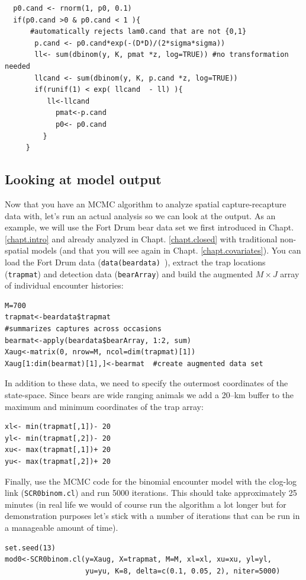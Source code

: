 \begin{verbatim}
  p0.cand <- rnorm(1, p0, 0.1)
  if(p0.cand >0 & p0.cand < 1 ){   
      #automatically rejects lam0.cand that are not {0,1}
       p.cand <- p0.cand*exp(-(D*D)/(2*sigma*sigma))
       ll<- sum(dbinom(y, K, pmat *z, log=TRUE)) #no transformation needed
       llcand <- sum(dbinom(y, K, p.cand *z, log=TRUE))
       if(runif(1) < exp( llcand  - ll) ){
          ll<-llcand
            pmat<-p.cand
            p0<- p0.cand
         }
     }
\end{verbatim}


\subsection{Looking at model output}
Now that you have an MCMC algorithm to analyze spatial capture-recapture 
data with, let's run an actual analysis so we can look at the output. As 
an example, we will use the Fort Drum 
bear data set we first introduced in Chapt. \ref{chapt.intro} and already analyzed in Chapt. \ref{chapt.closed} with 
traditional non-spatial models (and that you will see again in Chapt. 
\ref{chapt.covariates}). You can load the Fort Drum data
(\mbox{\tt data(beardata) }), extract the 
trap locations (\mbox{\tt trapmat}) and 
detection data (\mbox{\tt bearArray}) and build the augmented $M \times J$ array of individual 
encounter histories:
\begin{verbatim}
M=700
trapmat<-beardata$trapmat
#summarizes captures across occasions
bearmat<-apply(beardata$bearArray, 1:2, sum) 
Xaug<-matrix(0, nrow=M, ncol=dim(trapmat)[1])
Xaug[1:dim(bearmat)[1],]<-bearmat  #create augmented data set
\end{verbatim}

 In addition to these data, we need to specify 
the outermost coordinates of the state-space. Since bears are wide 
ranging animals we add a 20--km buffer to the maximum and minimum 
coordinates of the trap array:

\begin{verbatim}
xl<- min(trapmat[,1])- 20  
yl<- min(trapmat[,2])- 20 
xu<- max(trapmat[,1])+ 20
yu<- max(trapmat[,2])+ 20
\end{verbatim}

Finally, use the MCMC code for the binomial encounter model
with the clog-log link  ({\tt SCR0binom.cl}) and run 5000 iterations. This should take 
approximately 25 minutes (in real life we would of course run the algorithm a lot longer but for demonstration purposes let's stick with a number of iterations that can be run in a manageable amount of time).
\begin{verbatim}
set.seed(13)
mod0<-SCR0binom.cl(y=Xaug, X=trapmat, M=M, xl=xl, xu=xu, yl=yl, 
                   yu=yu, K=8, delta=c(0.1, 0.05, 2), niter=5000)
\end{verbatim}

